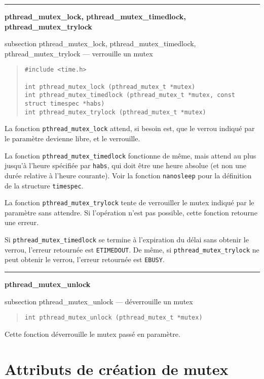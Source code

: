 \documentclass [twoside] {report}
\newcommand {\primitive} [1]
    {
	\phantomsection
	{\large \bf #1}
	\addcontentsline {toc} {subsection} {#1}
    }
\newcommand {\separation}
    {
	\vspace {5mm}
	\nopagebreak
	\hrule
    }
\begin{document}
\separation
\primitive {pthread\_mutex\_lock, pthread\_mutex\_timedlock, pthread\_mutex\_trylock} --- verrouille un mutex

\begin {quote}
\begin {verbatim}
#include <time.h>

int pthread_mutex_lock (pthread_mutex_t *mutex)
int pthread_mutex_timedlock (pthread_mutex_t *mutex, const struct timespec *habs)
int pthread_mutex_trylock (pthread_mutex_t *mutex)
\end{verbatim}
\end {quote}

La fonction \verb|pthread_mutex_lock| attend, si besoin est, que le
verrou indiqué par le paramètre devienne libre, et le verrouille.

La fonction \verb|pthread_mutex_timedlock| fonctionne de même, mais
attend au plus jusqu'à l'heure spécifiée par \texttt {habs}, qui
doit être une heure absolue (et non une durée relative à l'heure
courante). Voir la fonction \texttt {nanosleep} pour la définition
de la structure \texttt {timespec}.

La fonction \verb|pthread_mutex_trylock| tente de verrouiller le mutex
indiqué par le paramètre sans attendre. Si l'opération n'est pas
possible, cette fonction retourne une erreur.

Si \verb|pthread_mutex_timedlock| se termine à l'expiration du délai
sans obtenir le verrou, l'erreur retournée est \texttt {ETIMEDOUT}.
De même, si \verb|pthread_mutex_trylock| ne peut obtenir le verrou,
l'erreur retournée est \texttt {EBUSY}.


\separation
\primitive {pthread\_mutex\_unlock} --- déverrouille un mutex

\begin {quote}
\begin {verbatim}
int pthread_mutex_unlock (pthread_mutex_t *mutex)
\end{verbatim}
\end {quote}

Cette fonction déverrouille le mutex passé en paramètre.


\section {Attributs de création de mutex}
\end{document}
